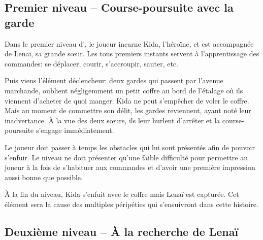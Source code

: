 \subsection[Niveau 1 -- Course-poursuite avec la garde]{Premier niveau -- Course-poursuite avec la garde}
\label{sec:coursepoursuiteGarde}

Dans le premier niveau d'\nomJeu, le joueur incarne Kida, l'héroïne, et est accompagnée de Lenaï, sa grande s\oe ur. Les tous premiers instants servent à l'apprentissage des commandes: se déplacer, courir, s'accroupir, sauter, etc.

Puis viens l'élément déclencheur: deux gardes qui passent par l'avenue marchande, oublient négligemment un petit coffre au bord de l'étalage où ils viennent d'acheter de quoi manger. Kida ne peut s'empêcher de voler le coffre. Mais au moment de commettre son délit, les gardes reviennent, ayant noté leur inadvertance. À la vue des deux s\oe urs, ils leur hurlent d'arrêter et la course-poursuite s'engage immédiatement.

Le joueur doit passer à temps les obstacles qui lui sont présentés afin de pouvoir s'enfuir. Le niveau ne doit présenter qu'une faible difficulté pour permettre au joueur à la fois de s'habituer aux commandes et d'avoir une première impression aussi bonne que possible.

À la fin du niveau, Kida s'enfuit avec le coffre mais Lenaï est capturée. Cet élément sera la cause des multiples péripéties qui s'ensuivront dans cette histoire.


\subsection[Niveau 2 -- À la recherche de Lenaï]{Deuxième niveau -- À la recherche de Lenaï}
\label{sec:rechercheLenai}


